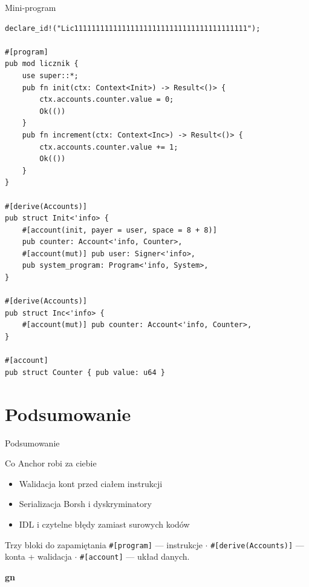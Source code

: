 \begin{frame}[fragile]{Mini-program}
\begin{lstlisting}
declare_id!("Lic1111111111111111111111111111111111111111");

#[program]
pub mod licznik {
    use super::*;
    pub fn init(ctx: Context<Init>) -> Result<()> {
        ctx.accounts.counter.value = 0;
        Ok(())
    }
    pub fn increment(ctx: Context<Inc>) -> Result<()> {
        ctx.accounts.counter.value += 1;
        Ok(())
    }
}

#[derive(Accounts)]
pub struct Init<'info> {
    #[account(init, payer = user, space = 8 + 8)]
    pub counter: Account<'info, Counter>,
    #[account(mut)] pub user: Signer<'info>,
    pub system_program: Program<'info, System>,
}

#[derive(Accounts)]
pub struct Inc<'info> {
    #[account(mut)] pub counter: Account<'info, Counter>,
}

#[account]
pub struct Counter { pub value: u64 }
\end{lstlisting}
\end{frame}

\section{Podsumowanie}

\begin{frame}{Podsumowanie}
  \begin{block}{Co Anchor robi za ciebie}
    \begin{itemize}
      \item Walidacja kont przed ciałem instrukcji
      \item Serializacja Borsh i dyskryminatory
      \item IDL i czytelne błędy zamiast surowych kodów
    \end{itemize}
  \end{block}
  \vspace{0.3cm}
  \begin{block}{Trzy bloki do zapamiętania}
    \texttt{\#[program]} --- instrukcje $\cdot$
    \texttt{\#[derive(Accounts)]} --- konta + walidacja $\cdot$
    \texttt{\#[account]} --- układ danych.
  \end{block}
\end{frame}

\begin{frame}[plain]
  \begin{center}
    \vfill
    {\Huge\bfseries\color{stplwhite} gn}
    \vfill
  \end{center}
\end{frame}


